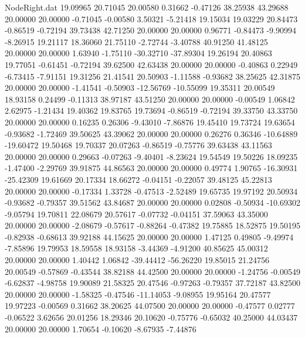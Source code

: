 \begin{filecontents}{NodeRight.dat}
  19.09965   20.71045   20.00580     0.31662   -0.47126   38.25938   43.29688   20.00000   20.00000   -0.71045   -0.00580    3.50321   -5.21418
  19.15034   19.03229   20.84473    -0.86519   -0.72194   39.73438   42.71250   20.00000   20.00000    0.96771   -0.84473   -9.90994   -8.26915
  19.21117   18.36060   21.75110    -2.72744   -3.40788   40.91250   41.48125   20.00000   20.00000    1.63940   -1.75110  -30.32710  -37.89304
  19.26194   20.40863   19.77051    -0.61451   -0.72194   39.62500   42.63438   20.00000   20.00000   -0.40863    0.22949   -6.73415   -7.91151
  19.31256   21.41541   20.50903    -1.11588   -0.93682   38.25625   42.31875   20.00000   20.00000   -1.41541   -0.50903  -12.56769  -10.55099
  19.35311   20.00549   18.93158     0.24499   -0.11313   38.97187   43.51250   20.00000   20.00000   -0.00549    1.06842    2.62975   -1.21434
  19.40362   19.83765   19.73694    -0.86519   -0.72194   39.33750   43.33750   20.00000   20.00000    0.16235    0.26306   -9.43010   -7.86876
  19.45410   19.73724   19.63654    -0.93682   -1.72469   39.50625   43.39062   20.00000   20.00000    0.26276    0.36346  -10.64889  -19.60472
  19.50468   19.70337   20.07263    -0.86519   -0.75776   39.63438   43.11563   20.00000   20.00000    0.29663   -0.07263   -9.40401   -8.23624
  19.54549   19.50226   18.09235    -1.47400   -2.29769   39.91875   44.86563   20.00000   20.00000    0.49774    1.90765  -16.30931  -25.42309
  19.61669   20.17334   18.66272    -0.04151   -0.22057   39.48125   45.22813   20.00000   20.00000   -0.17334    1.33728   -0.47513   -2.52489
  19.65735   19.97192   20.50934    -0.93682   -0.79357   39.51562   43.84687   20.00000   20.00000    0.02808   -0.50934  -10.69302   -9.05794
  19.70811   22.08679   20.57617    -0.07732   -0.04151   37.59063   43.35000   20.00000   20.00000   -2.08679   -0.57617   -0.88264   -0.47382
  19.75885   18.52875   19.50195    -0.82938   -0.68613   39.92188   44.15625   20.00000   20.00000    1.47125    0.49805   -9.49974   -7.85896
  19.79953   18.59558   18.93158    -3.44369   -4.91200   40.85625   45.00312   20.00000   20.00000    1.40442    1.06842  -39.44412  -56.26220
  19.85015   21.24756   20.00549    -0.57869   -0.43544   38.82188   44.42500   20.00000   20.00000   -1.24756   -0.00549   -6.62837   -4.98758
  19.90089   21.58325   20.47546    -0.97263   -0.79357   37.72187   43.82500   20.00000   20.00000   -1.58325   -0.47546  -11.14053   -9.08955
  19.95164   20.47577   19.97223    -0.00569    0.31662   38.20625   44.07500   20.00000   20.00000   -0.47577    0.02777   -0.06522    3.62656
  20.01256   18.29346   20.10620    -0.75776   -0.65032   40.25000   44.03437   20.00000   20.00000    1.70654   -0.10620   -8.67935   -7.44876

\end{filecontents}
